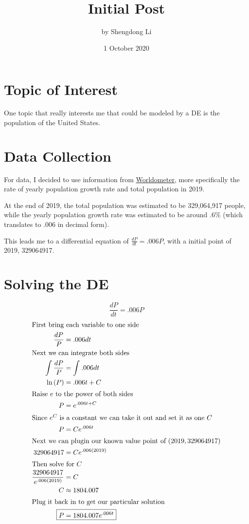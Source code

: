 \documentclass[12pt]{article}
\begin{document}
\title{Initial Post}
\author{by Shengdong Li}
\date{1 October 2020}
\maketitle

\section{Topic of Interest}

One topic that really interests me that could be modeled by a DE is the population of the United States.

\section{Data Collection}

For data, I decided to use information from \href{https://www.worldometers.info/world-population/us-population/}{Worldometer}, more specifically the rate of yearly population growth rate and total population in 2019.

At the end of 2019, the total population was estimated to be 329,064,917 people, while the yearly population growth rate was estimated to be around $.6\%$ (which translates to $.006$ in decimal form).

This leads me to a differential equation of $\frac{dP}{dt}=.006P$, with a initial point of 2019, 329064917.

\section{Solving the DE}
$$
  \frac{dP}{dt}=.006P
$$
\begin{align}
  \intertext{First bring each variable to one side}
  \frac{dP}{P}                                & =.006dt                     \\
  \intertext{Next we can integrate both sides}
  \int_{ }^{ }\frac{dP}{P}                    & =\int_{ }^{ }.006dt         \\
  \ln\left(P\right)                           & =.006t+C                    \\
  \intertext{Raise $e$ to the power of both sides}
  P                                           & =e^{.006t+C}                \\
  \intertext{Since $e^C$ is a constant we can take it out and set it as one $C$}
  P                                           & =Ce^{.006t}                 \\
  \intertext{Next we can plugin our known value point of $\left(2019,329064917\right)$}
  329064917                                   & =Ce^{.006\left(2019\right)} \\
  \intertext{Then solve for $C$}
  \frac{329064917}{e^{.006\left(2019\right)}} & =C                          \\
  C                                           & \approx1804.007             \\
  \intertext{Plug it back in to get our particular solution}
  \Aboxed{P                                   & =1804.007e^{.006t}}         \\
\end{align}
\end{document}
